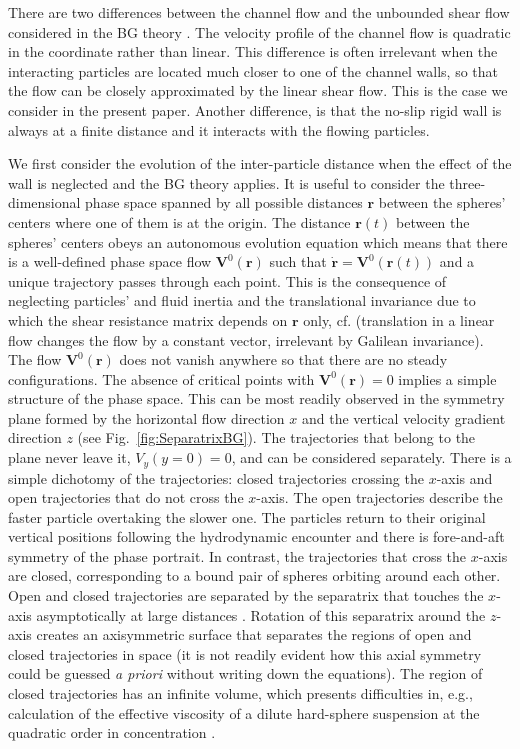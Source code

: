 There are two differences between the channel flow and the unbounded shear flow considered in the BG theory  \citep{lin_lee_sather_1970,batchelor_green_1972}. The velocity profile of the channel flow is quadratic \citep{quadratic} in the coordinate rather than linear. This difference is often irrelevant when the interacting particles are located much closer to one of the channel walls, so that the flow can be closely approximated by the linear shear flow. This is the case we consider in the present paper. Another difference, is that the no-slip rigid wall is always at a finite distance and it interacts with the flowing particles.

We first consider the evolution of the inter-particle distance when the effect of the wall is neglected and the BG theory applies. It is useful to consider the three-dimensional phase space spanned by all possible distances $\bm r$ between the spheres' centers where one of them is at the origin. The distance $\bm r(t)$ between the spheres' centers obeys an autonomous evolution equation which means that there is a well-defined phase space flow $\bm V^0(\bm r)$ such that $\dot{\bm r}=\bm V^0(\bm r(t))$ and a unique trajectory passes through each point. This is the consequence of neglecting particles' and fluid inertia and the translational invariance due to which the shear resistance matrix depends on $\bm r$ only, cf. \cite{sh} (translation in a linear flow changes the flow by a constant vector, irrelevant by Galilean invariance). The flow $\bm V^0(\bm r)$ does not vanish anywhere so that there are no steady configurations. The absence of critical points with $\bm V^0(\bm r)=0$  implies a simple structure of the phase space. This can be most readily observed in the symmetry plane formed by the horizontal flow direction $x$ and the vertical velocity gradient direction $z$ (see Fig.~\ref{fig:SeparatrixBG}). The trajectories that belong to the plane never leave it, $V_y(y=0)=0$, and can be considered separately. There is a simple dichotomy of the trajectories:  closed trajectories crossing the $x$-axis and open trajectories that do not cross the $x$-axis. The open trajectories describe the faster particle overtaking the slower one. The particles return to their original vertical positions following the hydrodynamic encounter and there is fore-and-aft symmetry of the phase portrait. In contrast, the trajectories that cross the $x$-axis are closed, corresponding to a bound pair of spheres orbiting around each other. Open and closed trajectories are separated by the separatrix that touches the $x$-axis asymptotically at large distances \citep{lin_lee_sather_1970}. Rotation of this separatrix around the $z$-axis creates an axisymmetric surface that separates the regions of open and closed trajectories in space (it is not readily evident how this axial symmetry could be guessed \textit{a priori} without writing down the equations). The region of closed trajectories has an infinite volume, which presents difficulties in, e.g., calculation of the effective viscosity of a dilute hard-sphere suspension at the quadratic order in concentration \citep{batchelor_green_1972b}.


